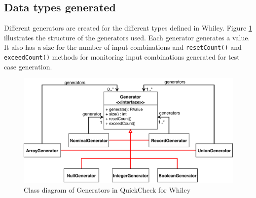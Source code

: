 \subsection{Data types generated}
Different generators are created for the different types defined in Whiley. 
Figure \ref{fig:qc-generators} illustrates the structure of the generators used.
Each generator generates a value. It also has a size for the number of input combinations and \texttt{resetCount()} and \texttt{exceedCount()} methods for monitoring input combinations generated for test case generation.
 
\begin{figure}
	\includegraphics[width=\textwidth]{qc-generators}
	\caption{Class diagram of Generators in QuickCheck for Whiley}
	\label{fig:qc-generators}
	\centering
\end{figure}

